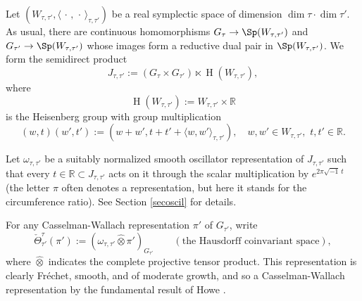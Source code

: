 \documentclass[12pt,a4paper]{amsart}
\newcommand{\oH}{\operatorname{H}}
\newcommand{\R}{\mathbb R}
\newcommand{\la}{\langle}
\newcommand{\ra}{\rangle}
\numberwithin{equation}{section}
\theoremstyle{remark}
\begin{document}
   Let $(W_{\tau, \tau'}, \la \,\cdot\,,\,\cdot\,\ra_{\tau, \tau'})$ be a real symplectic space of  dimension $\dim \tau\cdot \dim \tau'$. As usual, there are continuous homomorphisms $G_\tau\rightarrow \Sp(W_{\tau, \tau'})$ and $G_{\tau'}\rightarrow \Sp(W_{\tau, \tau'})$ whose images form a reductive dual pair in $\Sp(W_{\tau, \tau'})$. We form the semidirect product
   \[
   J_{\tau, \tau'}:=(G_\tau\times G_{\tau'})\ltimes \oH(W_{\tau, \tau'}),
   \]
   where
  \[
  \oH(W_{\tau, \tau'}):=W_{\tau, \tau'}\times \R
  \]
  is the Heisenberg group with group multiplication
  \[
  (w,t)(w',t'):=(w+w', t+t'+\la w,w'\ra_{\tau, \tau'}), \quad
  w,w'\in W_{\tau, \tau'},\,\,t,t'\in \R.
 \]

 Let $\omega_{\tau, \tau'}$ be a suitably normalized smooth oscillator representation of $J_{\tau, \tau'}$ such that every $t\in \R\subset J_{\tau, \tau'}$ acts on it through the scalar multiplication by $e^{2\pi \sqrt{-1}\, t}$ (the letter $\pi$  often denotes a representation, but here it stands for the circumference ratio).  See Section \ref{secoscil} for details.


 For any Casselman-Wallach representation $\pi'$ of $G_{\tau'}$, write
 \[
   \check \Theta_{\tau'}^{\tau}(\pi'):=(\omega_{\tau, \tau'}\widehat \otimes \pi')_{G_{\tau'}} \qquad (\textrm{the Hausdorff coinvariant space}),
 \]
 where $\widehat \otimes$ indicates the complete projective tensor product. This representation is clearly Fr\'echet, smooth, and of moderate growth, and so a Casselman-Wallach representation by the fundamental result of Howe \cite{Howe89}.
\end{document}
